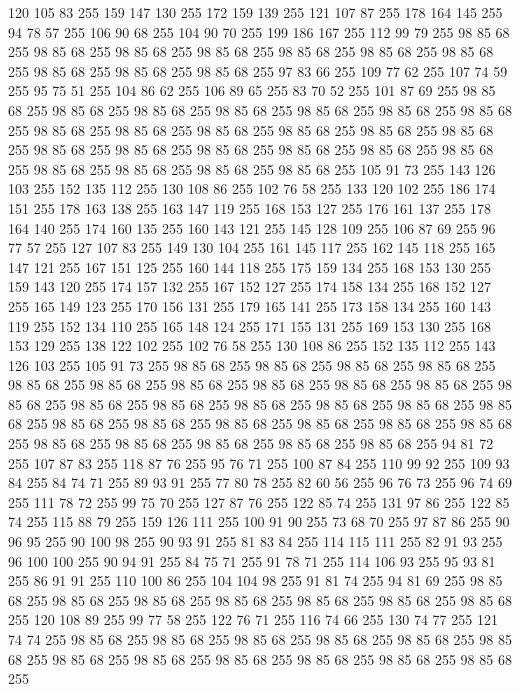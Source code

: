 120 105 83 255 159 147 130 255 172 159 139 255 121 107 87 255 178 164 145 255 94 78 57 255 106 90 68 255 104 90 70 255 199 186 167 255 112 99 79 255 98 85 68 255 98 85 68 255 98 85 68 255 98 85 68 255 98 85 68 255 98 85 68 255 98 85 68 255 98 85 68 255 98 85 68 255 98 85 68 255 97 83 66 255 109 77 62 255 107 74 59 255 95 75 51 255 104 86 62 255 106 89 65 255 83 70 52 255 101 87 69 255 98 85 68 255 98 85 68 255 98 85 68 255 98 85 68 255 98 85 68 255 98 85 68 255 98 85 68 255 98 85 68 255 98 85 68 255 98 85 68 255 98 85 68 255 98 85 68 255 98 85 68 255 98 85 68 255 98 85 68 255 98 85 68 255 98 85 68 255 98 85 68 255 98 85 68 255 98 85 68 255 98 85 68 255 98 85 68 255 98 85 68 255 105 91 73 255 143 126 103 255 152 135 112 255 130 108 86 255 102 76 58 255 133 120 102 255 186 174 151 255 178 163 138 255 163 147 119 255 168 153 127 255 176 161 137 255 178 164 140 255 174 160 135 255
160 143 121 255 145 128 109 255 106 87 69 255 96 77 57 255 127 107 83 255 149 130 104 255 161 145 117 255 162 145 118 255 165 147 121 255 167 151 125 255 160 144 118 255 175 159 134 255 168 153 130 255 159 143 120 255 174 157 132 255 167 152 127 255 174 158 134 255 168 152 127 255 165 149 123 255 170 156 131 255 179 165 141 255 173 158 134 255 160 143 119 255 152 134 110 255 165 148 124 255 171 155 131 255 169 153 130 255 168 153 129 255 138 122 102 255 102 76 58 255 130 108 86 255 152 135 112 255 143 126 103 255 105 91 73 255 98 85 68 255 98 85 68 255 98 85 68 255 98 85 68 255 98 85 68 255 98 85 68 255 98 85 68 255 98 85 68 255 98 85 68 255 98 85 68 255 98 85 68 255 98 85 68 255 98 85 68 255 98 85 68 255 98 85 68 255 98 85 68 255 98 85 68 255 98 85 68 255 98 85 68 255 98 85 68 255 98 85 68 255 98 85 68 255 98 85 68 255 98 85 68 255 98 85 68 255 98 85 68 255 98 85 68 255 98 85 68 255 94 81 72 255 107 87 83 255
118 87 76 255 95 76 71 255 100 87 84 255 110 99 92 255 109 93 84 255 84 74 71 255 89 93 91 255 77 80 78 255 82 60 56 255 96 76 73 255 96 74 69 255 111 78 72 255 99 75 70 255 127 87 76 255 122 85 74 255 131 97 86 255 122 85 74 255 115 88 79 255 159 126 111 255 100 91 90 255 73 68 70 255 97 87 86 255 90 96 95 255 90 100 98 255 90 93 91 255 81 83 84 255 114 115 111 255 82 91 93 255 96 100 100 255 90 94 91 255 84 75 71 255 91 78 71 255 114 106 93 255 95 93 81 255 86 91 91 255 110 100 86 255 104 104 98 255 91 81 74 255 94 81 69 255 98 85 68 255 98 85 68 255 98 85 68 255 98 85 68 255 98 85 68 255 98 85 68 255 98 85 68 255 120 108 89 255 99 77 58 255 122 76 71 255 116 74 66 255 130 74 77 255 121 74 74 255 98 85 68 255 98 85 68 255 98 85 68 255 98 85 68 255 98 85 68 255 98 85 68 255 98 85 68 255 98 85 68 255 98 85 68 255 98 85 68 255 98 85 68 255 98 85 68 255

